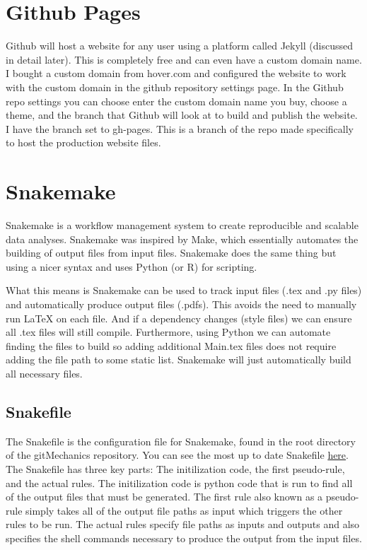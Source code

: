 \documentclass[landscape, twocolumn, 12pt]{article}
\begin{document}
\section{Github Pages}
Github will host a website for any user using a platform called Jekyll (discussed in detail later). This is completely free and can even have a custom domain name. I bought a custom domain from hover.com and configured the website to work with the custom domain in the github repository settings page. In the Github repo settings you can choose enter the custom domain name you buy, choose a theme, and the branch that Github will look at to build and publish the website. I have the branch set to gh-pages. This is a branch of the repo made specifically to host the production website files. 



\section{Snakemake}
Snakemake is a workflow management system to create reproducible and scalable data analyses. Snakemake was inspired by Make, which essentially automates the building of output files from input files. Snakemake does the same thing but using a nicer syntax and uses Python (or R) for scripting.

What this means is Snakemake can be used to track input files (.tex and .py files) and automatically produce output files (.pdfs). This avoids the need to manually run \LaTeX{} on each file. And if a dependency changes (style files) we can ensure all .tex files will still compile. Furthermore, using Python we can automate finding the files to build so adding additional Main.tex files does not require adding the file path to some static list. Snakemake will just automatically build all necessary files.

\subsection{Snakefile}
The Snakefile is the configuration file for Snakemake, found in the root directory of the gitMechanics repository. You can see the most up to date Snakefile \href{http://www.gitmechanics.com/Snakefile}{here}. The Snakefile has three key parts: The initilization code, the first pseudo-rule, and the actual rules. The initilization code is python code that is run to find all of the output files that must be generated. The first rule also known as a pseudo-rule simply takes all of the output file paths as input which triggers the other rules to be run. The actual rules specify file paths as inputs and outputs and also specifies the shell commands necessary to produce the output from the input files.
\end{document}
